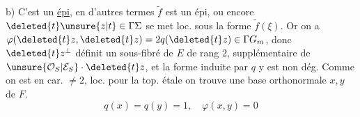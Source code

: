 b) C'est un \uline{épi}, en d'autres termes  $\widetilde f$ est un épi, ou encore  $\deleted{t}\unsure{z|t}\in\Gamma\Sigma$ se met loc. sous la forme $\widetilde f(\xi)$. Or on a $\varphi(\deleted{t}z,\deleted{t}z)=2q(\deleted{t}z)\in\Gamma G_m$, donc $\deleted{t}z^\perp$ définit un sous-fibré de
$E$ de rang $2$,  supplémentaire de $\unsure{\mathcal O_S|\mathcal E_S}\cdot\deleted{t}z$,  et la forme induite par $q$ y est non dég. Comme on est en car. $\ne2$, loc. pour la top. étale on trouve une base orthonormale $x,y$ de $F$.
\[
q(x)=q(y)=1,\quad\varphi(x,y)=0
\]
